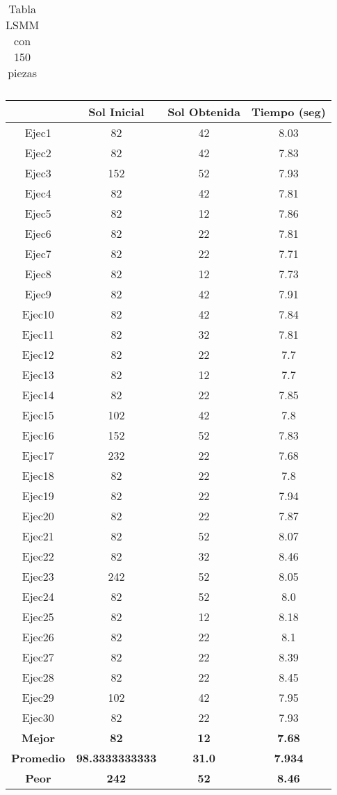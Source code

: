 \begin{center}
\begin{table}
\begin{tabular}{|c|c|c|c|}
\end{tabular}
\caption{Tabla LSMM con 150 piezas}
\end{table}

\begin{table}

\begin{tabular}{|c|c|c|c|}



\hline
 & {\bf Sol Inicial} & {\bf Sol Obtenida} & {\bf Tiempo (seg)} \\
\hline
Ejec1 & 82 & 42  & 8.03 \\
\hline
Ejec2 & 82 & 42  & 7.83 \\
\hline
Ejec3 & 152 & 52  & 7.93 \\
\hline
Ejec4 & 82 & 42  & 7.81 \\
\hline
Ejec5 & 82 & 12  & 7.86 \\
\hline
Ejec6 & 82 & 22  & 7.81 \\
\hline
Ejec7 & 82 & 22  & 7.71 \\
\hline
Ejec8 & 82 & 12  & 7.73 \\
\hline
Ejec9 & 82 & 42  & 7.91 \\
\hline
Ejec10 & 82 & 42  & 7.84 \\
\hline
Ejec11 & 82 & 32  & 7.81 \\
\hline
Ejec12 & 82 & 22  & 7.7 \\
\hline
Ejec13 & 82 & 12  & 7.7 \\
\hline
Ejec14 & 82 & 22  & 7.85 \\
\hline
Ejec15 & 102 & 42  & 7.8 \\
\hline
Ejec16 & 152 & 52  & 7.83 \\
\hline
Ejec17 & 232 & 22  & 7.68 \\
\hline
Ejec18 & 82 & 22  & 7.8 \\
\hline
Ejec19 & 82 & 22  & 7.94 \\
\hline
Ejec20 & 82 & 22  & 7.87 \\
\hline
Ejec21 & 82 & 52  & 8.07 \\
\hline
Ejec22 & 82 & 32  & 8.46 \\
\hline
Ejec23 & 242 & 52  & 8.05 \\
\hline
Ejec24 & 82 & 52  & 8.0 \\
\hline
Ejec25 & 82 & 12  & 8.18 \\
\hline
Ejec26 & 82 & 22  & 8.1 \\
\hline
Ejec27 & 82 & 22  & 8.39 \\
\hline
Ejec28 & 82 & 22  & 8.45 \\
\hline
Ejec29 & 102 & 42  & 7.95 \\
\hline
Ejec30 & 82 & 22  & 7.93 \\
\hline
{\bf Mejor} & {\bf 82} & {\bf 12} & {\bf 7.68} \\
\hline
{\bf Promedio} & {\bf 98.3333333333} & {\bf 31.0} & {\bf 7.934} \\
\hline
{\bf Peor} & {\bf 242} & {\bf 52} & {\bf 8.46} \\
\hline


\end{tabular}
\end{table}
\end{center}
